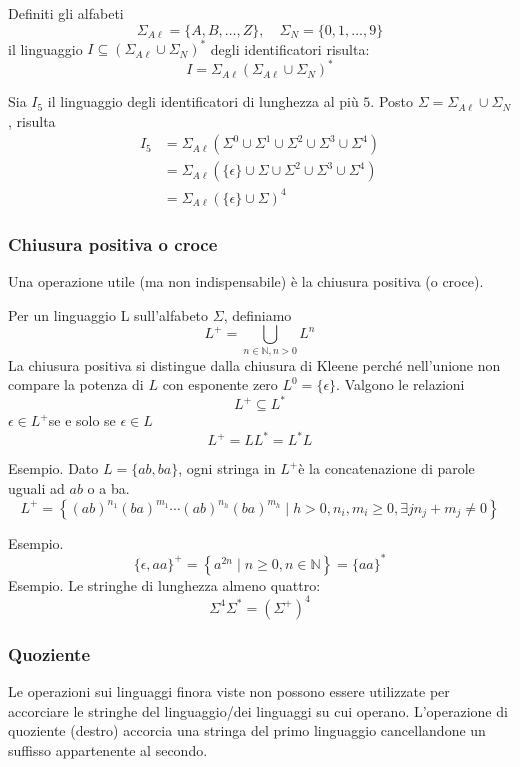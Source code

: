 Definiti gli alfabeti
$$
\Sigma_{A \ell}=\{A, B, \ldots, Z\}, \quad \Sigma_{N}=\{0,1, \ldots, 9\}
$$
il linguaggio $I \subseteq\left(\Sigma_{A \ell} \cup \Sigma_{N}\right)^{*}$ degli identificatori risulta:
$$
I=\Sigma_{A \ell}\left(\Sigma_{A \ell} \cup \Sigma_{N}\right)^{*}
$$

Sia $I_{5}$ il linguaggio degli identificatori di lunghezza al più $5 .$ Posto $\Sigma=\Sigma_{A \ell} \cup \Sigma_{N}$, risulta
$$
\begin{aligned}
I_{5} &=\Sigma_{A \ell}\left(\Sigma^{0} \cup \Sigma^{1} \cup \Sigma^{2} \cup \Sigma^{3} \cup \Sigma^{4}\right) \\
&=\Sigma_{A \ell}\left(\{\epsilon\} \cup \Sigma \cup \Sigma^{2} \cup \Sigma^{3} \cup \Sigma^{4}\right) \\
&=\Sigma_{A \ell}(\{\epsilon\} \cup \Sigma)^{4}
\end{aligned}
$$

\subsubsection{Chiusura positiva o croce}
Una operazione utile (ma non indispensabile) è la chiusura positiva (o croce).

Per un linguaggio L sull'alfabeto $\Sigma$, definiamo
$$
L^{+}=\bigcup_{n \in \mathbb{N}, n>0} L^{n}
$$
La chiusura positiva si distingue dalla chiusura di Kleene perché nell'unione non compare la potenza di $L$ con esponente zero $L^{0}=\{\epsilon\}$.
Valgono le relazioni
$$
L^{+} \subseteq L^{*}
$$
$\epsilon \in L^{+}$se e solo se $\epsilon \in L$
$$
L^{+}=L L^{*}=L^{*} L
$$

Esempio. Dato $L=\{a b, b a\}$, ogni stringa in $L^{+}$è la concatenazione di parole uguali ad $a b$ o a ba.
$$
L^{+}=\left\{(a b)^{n_{1}}(b a)^{m_{1}} \cdots(a b)^{n_{h}}(b a)^{m_{h}} \mid h>0, n_{i}, m_{i} \geq 0, \exists j n_{j}+m_{j} \neq 0\right\}
$$

Esempio.
$$
\{\epsilon, a a\}^{+}=\left\{a^{2 n} \mid n \geq 0, n \in \mathbb{N}\right\}=\{a a\}^{*}
$$
Esempio. Le stringhe di lunghezza almeno quattro:
$$
\Sigma^{4} \Sigma^{*}=\left(\Sigma^{+}\right)^{4}
$$

\subsubsection{Quoziente}
Le operazioni sui linguaggi finora viste non possono essere utilizzate per accorciare le stringhe del linguaggio/dei linguaggi su cui operano.
L'operazione di quoziente (destro) accorcia una stringa del primo linguaggio cancellandone un suffisso appartenente al secondo.

